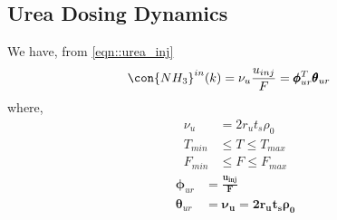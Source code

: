 \subsection{Urea Dosing Dynamics}
We have, from \ref{eqn::urea_inj}
\begin{align}
    \con{NH_3}^{in}(k) &= \nu_u \frac{u_{inj}}{F} = \pmb \phi_{ur}^T \pmb \theta_{ur}
    \label{eqn::urea_parm}
\end{align}
where,
\begin{align*}
    \nu_u &= 2 r_u t_s \rho_0\\
    T_{min} &\leq T \leq T_{max}\\
    F_{min} &\leq F \leq F_{max}
\end{align*}
\begin{align*}
        \pmb \phi_{ur} &= \bm{\frac{u_{inj}}{F}}\\
        \pmb \theta_{ur} &= \bm{\nu_u} = \bm{2 r_u t_s \rho_0}
\end{align*}
